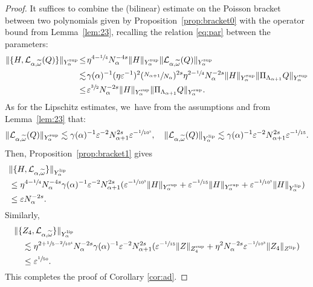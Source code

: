 \documentclass[JEP,XML,SOM,Unicode,published]{cedram}
\theoremstyle{plain}
\theoremstyle{definition}
\newcommand{\1}{\mathbf{1}}
\newcommand{\Ysup}[1]{Y_{#1}^{\mathrm{sup}}}
\newcommand{\Ylip}[1]{Y_{#1}^{\mathrm{lip}}}
\let\epsilon\varepsilon
\begin{document}
\begin{proof}
It suffices to combine the (bilinear) estimate on the Poisson bracket between two polynomials given by Proposition~\ref{prop:bracket0} with the operator bound from Lemma~\ref{lem:23}, recalling the relation \ref{eq:par} between the parameters:
\begin{align*}
\|\{H,\mathcal{L}_{\alpha,\widetilde{\omega}}(Q)\}\|_{\Ysup{\alpha}}
&\!\leq\!
\eta^{4-\sfrac{1}{4}}N_{\alpha}^{-4s}
\|H\|_{\Ysup{\alpha}}
\|
\mathcal{L}_{\alpha,\widetilde{\omega}}(Q)
\|_{\Ysup{\alpha}} \\
&\!\lesssim\!
\gamma(\alpha)^{-1}(\eta\epsilon^{-1})^{2}(\sfrac{N_{\alpha+1}}{N_{\alpha}})^{2s}\eta^{2-\sfrac{1}{4}}N_{\alpha}^{-2s}
\|H\|_{\Ysup{\alpha}}
\|\Pi_{\Lambda_{\alpha+1}}Q\|_{\Ysup{\alpha}} \\
&\!\leq\!
\epsilon^{\sfrac{3}{2}}N_{\alpha}^{-2s}
\|H\|_{\Ysup{\alpha}}
\|\Pi_{\Lambda_{\alpha+1}}Q\|_{\Ysup{\alpha}}.
\end{align*}
As for the Lipschitz estimates, we~have from the assumptions and from Lemma~\ref{lem:23} that:
\[
\|
\mathcal{L}_{\alpha,\widetilde{\omega}}(Q)
\|_{\Ysup{\alpha}}
\lesssim \gamma(\alpha)^{-1}\epsilon^{-2}N_{\alpha+1}^{2s}\epsilon^{-\sfrac{1}{10^{3}}},
\quad
\|
\mathcal{L}_{\alpha,\widetilde{\omega}}(Q)
\|_{\Ylip{\alpha}}
\lesssim
\gamma(\alpha)^{-1}\epsilon^{-2}N_{\alpha+1}^{2s}\epsilon^{-\sfrac{1}{15}}.
\]
Then, Proposition~\ref{prop:bracket1} gives
\begin{align*}
&\|\{H,\mathcal{L}_{\alpha,\widetilde{\omega}}\}\|_{\Ylip{\alpha}} \\
&\leq \eta^{4-\sfrac{1}{4}}N_{\alpha}^{-4s}
\gamma(\alpha)^{-1}\epsilon^{-2}N_{\alpha+1}^{2s}(
\epsilon^{-\sfrac{1}{10^{3}}}\|H\|_{\Ysup{\alpha}}
+
\epsilon^{-\sfrac{1}{15}}
\|H\|_{\Ysup{\alpha}}
+
\epsilon^{-\sfrac{1}{10^{3}}}
\|H\|_{\Ylip{\alpha}}
)\\
&\leq
\epsilon N_{\alpha}^{-2s}.
\end{align*}
Similarly,
\begin{align*}
\|\{&Z_{4},\mathcal{L}_{\alpha,\widetilde{\omega}}\}\|_{\Ylip{\alpha}} \\
&\lesssim \eta^{2+\sfrac{1}{5}-\sfrac{2}{10^{4}}}N_{\alpha}^{-2s}
\gamma(\alpha)^{-1}\epsilon^{-2}N_{\alpha+1}^{2s}
(
\epsilon^{-\sfrac{1}{15}}\|Z\|_{Z_{4}^{\mathrm{sup}}}
+\eta^{2}N_{\alpha}^{-2s}\epsilon^{-\sfrac{1}{10^{3}}}\|Z_{4}\|_{Z^{\mathrm{lip}}})\\
&\leq\epsilon^{\sfrac{1}{50}}.
\end{align*}
This completes the proof of Corollary \ref{cor:ad}.
\end{proof}
\end{document}
